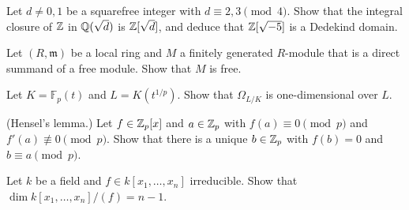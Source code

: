 \begin{exercise}\label{commutative-algebra:exercise-ring-of-integers}
Let $d \neq 0, 1$ be a squarefree integer with $d \equiv 2, 3 \pmod 4$. Show that the integral closure of $\mathbb{Z}$ in $\mathbb{Q}(\sqrt d)$ is
$\mathbb{Z}[\sqrt d]$, and deduce that $\mathbb{Z}[\sqrt{-5}]$ is a Dedekind domain.
\end{exercise}

\begin{exercise}\label{commutative-algebra:exercise-nakayama-projective}
Let $(R, \mathfrak{m})$ be a local ring and $M$ a finitely generated $R$-module that is a direct summand of a free module. Show that $M$ is
free.
\end{exercise}

\begin{exercise}\label{commutative-algebra:exercise-inseparable-differentials}
Let $K = \mathbb{F}_p(t)$ and $L = K(t^{1/p})$. Show that $\Omega_{L/K}$ is one-dimensional over $L$.
\end{exercise}

\begin{exercise}\label{commutative-algebra:exercise-hensel}
(Hensel's lemma.) Let $f \in \mathbb{Z}_p[x]$ and $a \in \mathbb{Z}_p$ with $f(a) \equiv 0 \pmod p$ and $f'(a) \not\equiv 0 \pmod p$. Show that there is a unique
$b \in \mathbb{Z}_p$ with $f(b) = 0$ and $b \equiv a \pmod p$.
\end{exercise}

\begin{exercise}\label{commutative-algebra:exercise-dimension-hypersurface}
Let $k$ be a field and $f \in k[x_1, \ldots, x_n]$ irreducible. Show that $\dim k[x_1, \ldots, x_n]/(f) = n - 1$.
\end{exercise}
